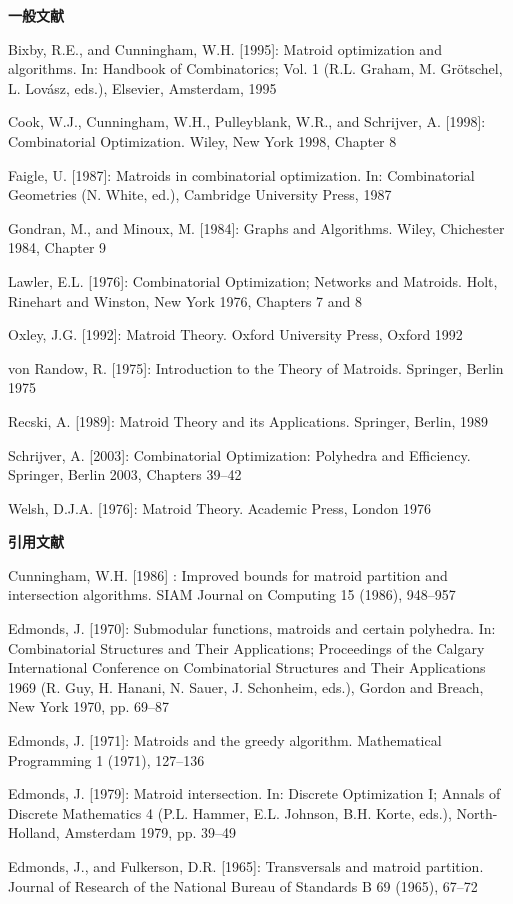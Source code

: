 {\small\setlength{\parindent}{0pt}\setlength{\parskip}{5pt}\sloppy
\textbf{一般文献}\par
Bixby, R.E., and Cunningham, W.H. [1995]: Matroid optimization and algorithms. In: Handbook of Combinatorics; Vol. 1 (R.L. Graham, M. Grötschel, L. Lovász, eds.), Elsevier, Amsterdam, 1995\par
Cook, W.J., Cunningham, W.H., Pulleyblank, W.R., and Schrijver, A. [1998]: Combinatorial Optimization. Wiley, New York 1998, Chapter 8\par
Faigle, U. [1987]: Matroids in combinatorial optimization. In: Combinatorial Geometries (N. White, ed.), Cambridge University Press, 1987\par
Gondran, M., and Minoux, M. [1984]: Graphs and Algorithms. Wiley, Chichester 1984, Chapter 9\par
Lawler, E.L. [1976]: Combinatorial Optimization; Networks and Matroids. Holt, Rinehart and Winston, New York 1976, Chapters 7 and 8\par
Oxley, J.G. [1992]: Matroid Theory. Oxford University Press, Oxford 1992\par
von Randow, R. [1975]: Introduction to the Theory of Matroids. Springer, Berlin 1975\par
Recski, A. [1989]: Matroid Theory and its Applications. Springer, Berlin, 1989\par
Schrijver, A. [2003]: Combinatorial Optimization: Polyhedra and Efficiency. Springer, Berlin 2003, Chapters 39–42\par
Welsh, D.J.A. [1976]: Matroid Theory. Academic Press, London 1976\par
\textbf{引用文献}\par
Cunningham, W.H. [1986] : Improved bounds for matroid partition and intersection algorithms. SIAM Journal on Computing 15 (1986), 948–957\par
Edmonds, J. [1970]: Submodular functions, matroids and certain polyhedra. In: Combinatorial Structures and Their Applications; Proceedings of the Calgary International Conference on Combinatorial Structures and Their Applications 1969 (R. Guy, H. Hanani, N. Sauer, J. Schonheim, eds.), Gordon and Breach, New York 1970, pp. 69–87\par
Edmonds, J. [1971]: Matroids and the greedy algorithm. Mathematical Programming 1 (1971), 127–136\par
Edmonds, J. [1979]: Matroid intersection. In: Discrete Optimization I; Annals of Discrete Mathematics 4 (P.L. Hammer, E.L. Johnson, B.H. Korte, eds.), North-Holland, Amsterdam 1979, pp. 39–49\par
Edmonds, J., and Fulkerson, D.R. [1965]: Transversals and matroid partition. Journal of Research of the National Bureau of Standards B 69 (1965), 67–72\par
}

